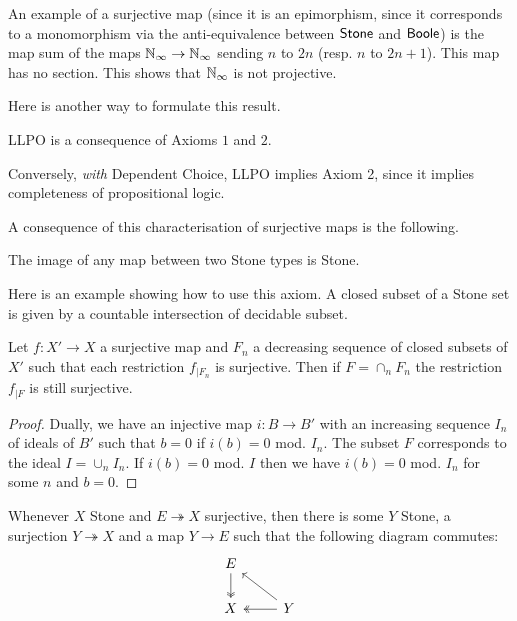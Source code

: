 An example of a surjective map (since it is an epimorphism, since it corresponds to a monomorphism via the anti-equivalence
between $\mathsf{Stone}$ and $\mathsf{Boole}$) is the map sum of the maps $\mathbb{N}_{\infty}\rightarrow \mathbb{N}_{\infty}$ sending $n$ to $2n$ (resp. $n$ to $2n+1$).
This map has no section. This shows that $\mathbb{N}_{\infty}$ is not projective.

Here is another way to formulate this result.

\begin{proposition}
  LLPO is a consequence of Axioms $1$ and $2$.
\end{proposition}

Conversely, {\em with} Dependent Choice, LLPO implies Axiom 2, since it implies completeness of propositional logic.


A consequence of this characterisation of surjective maps is the following.

\begin{proposition}
  The image of any map between two Stone types is Stone.
\end{proposition}

Here is an example showing how to use this axiom. A closed subset of a Stone set is given by a countable
intersection of decidable subset.

\begin{proposition}
  Let $f:X'\rightarrow X$ a surjective map and $F_n$ a decreasing sequence of closed subsets of $X'$ such that
  each restriction $f_{|F_n}$ is surjective. Then if $F = \cap_n F_n$ the restriction $f_{|F}$ is still surjective.
\end{proposition}

\begin{proof}
  Dually, we have an injective map $i:B\rightarrow B'$ with an increasing sequence $I_n$ of ideals of $B'$ such that
  $b = 0$ if $i(b) = 0$ mod. $I_n$. The subset $F$ corresponds to the ideal $I = \cup_n I_n$. If $i(b) = 0$ mod. $I$
  then we have $i(b) = 0$ mod. $I_n$ for some $n$ and $b = 0$. 
\end{proof}





\begin{axiomNum}
  Whenever $X$ Stone and $E\twoheadrightarrow X$ surjective, then there is some $Y$ Stone,
    a surjection $Y \twoheadrightarrow X$ and a map $Y\to E$ such that the following diagram commutes:
    \begin{equation}\begin{tikzcd}
      E \arrow[d,""',two heads]\\
      X & \arrow[l, "", two heads] Y\arrow[lu, ""']
    \end{tikzcd}\end{equation}  
\end{axiomNum} 




